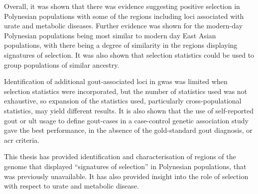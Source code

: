 \documentclass[]{report}
\begin{document}
Overall, it was shown that there was evidence suggesting positive
selection in Polynesian populations with some of the regions including
loci associated with urate and metabolic diseases. Further evidence was
shown for the modern-day Polynesian populations being most similar to
modern day East Asian populations, with there being a degree of
similarity in the regions displaying signatures of selection. It was
also shown that selection statistics could be used to group populations
of similar ancestry.

Identification of additional gout-associated loci in \gls{gwas} was
limited when selection statistics were incorporated, but the number of
statistics used was not exhaustive, so expansion of the statistics used,
particularly cross-populational statistics, may yield different results.
It is also shown that the use of self-reported gout or \gls{ult} usage
to define gout-cases in a case-control genetic association study gave
the best performance, in the absence of the gold-standard gout
diagnosis, or \gls{acr} criteria.

This thesis has provided identification and characterisation of regions
of the genome that displayed ``signatures of selection'' in Polynesian
populations, that was previously unavailable. It has also provided
insight into the role of selection with respect to urate and metabolic
disease.



\end{document}
